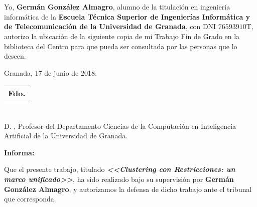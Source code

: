 \chapter*{}
\thispagestyle{empty}


Yo, \textbf{Germán González Almagro}, alumno de la titulación en ingeniería informática de la \textbf{Escuela Técnica Superior
de Ingenierías Informática y de Telecomunicación de la Universidad de Granada}, con DNI $\mathrm{76593910}$T, autorizo la
ubicación de la siguiente copia de mi Trabajo Fin de Grado en la biblioteca del Centro para que pueda ser
consultada por las personas que lo deseen.

\vspace{0.1cm}

\begin{flushleft}
	Granada, 17 de junio de 2018.
\end{flushleft}

\vspace{2.5cm}

\begin{flushright}
	
	\begin{tabular}{m{6cm}}
		\\ \hline
		\centering\textbf{Fdo. \myName} \\
	\end{tabular}
	
\end{flushright}


\chapter*{}
\thispagestyle{empty}


D. \textbf{\myProf}, Profesor del Departamento Ciencias de la Computación en Inteligencia Artificial de la Universidad de Granada.

\vspace{0.5cm}

\textbf{Informa:}

\vspace{0.5cm}

Que el presente trabajo, titulado \textit{\textbf{<<Clustering con Restricciones: un marco unificado>>}},
ha sido realizado bajo su supervisión por \textbf{Germán González Almagro}, y autorizamos la defensa de dicho trabajo ante el tribunal
que corresponda.

